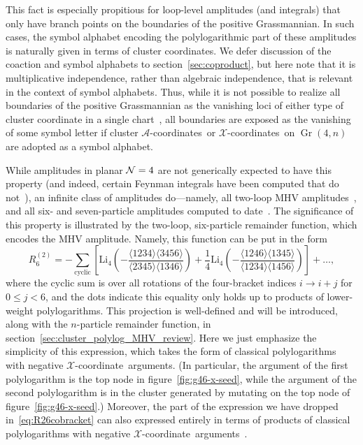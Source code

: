 \documentclass[11pt]{article}
\DeclareMathOperator{\Gr}{Gr}
\def\xcoord{$\mathcal{X}$-coordinate}
\def\xcoords{$\mathcal{X}$-coordinates}
\def\acoords{$\mathcal{A}$-coordinates}
\begin{document}
This fact is especially propitious for loop-level amplitudes (and integrals) that only have branch points on the boundaries of the positive Grassmannian. In such cases, the symbol alphabet encoding the polylogarithmic part of these amplitudes is naturally given in terms of cluster coordinates. We defer discussion of the coaction and symbol alphabets to section~\ref{sec:coproduct}, but here note that it is multiplicative independence, rather than algebraic independence, that is relevant in the context of symbol alphabets. Thus, while it is not possible to realize all boundaries of the positive Grassmannian as the vanishing loci of either type of cluster coordinate in a single chart~\cite{ArkaniHamed:2012nw}, all boundaries are exposed as the vanishing of some symbol letter if cluster \acoords\ or \xcoords\ on $\Gr(4,n)$ are adopted as a symbol alphabet.

While amplitudes in planar ${\cal N}=4$ are not generically expected to have this property (and indeed, certain Feynman integrals have been computed that do not~\cite{Bourjaily:2018aeq,Henn:2018cdp}), an infinite class of amplitudes do---namely, all two-loop MHV amplitudes~\cite{CaronHuot:2011ky}, and all six- and seven-particle amplitudes computed to date~\cite{CaronHuot:2011kk,Dixon:2014iba,Drummond:2014ffa,Dixon:2015iva,Caron-Huot:2016owq,Dixon:2016nkn}. The significance of this property is illustrated by the two-loop, six-particle remainder function, which encodes the MHV amplitude. Namely, this function can be put in the form
\begin{equation} \label{eq:R26cobracket}
	R^{(2)}_6 = -\sum_{\text{cyclic}} \left[ \text{Li}_4\left(-\frac{\langle 1234 \rangle \langle 3456 \rangle}{\langle 2345 \rangle \langle 1346 \rangle}\right) + \frac{1}{4} \text{Li}_4 \left(-\frac{\langle 1246 \rangle \langle 1345 \rangle}{\langle 1234 \rangle \langle 1456 \rangle}\right) \right] + \dots,
\end{equation}
where the cyclic sum is over all rotations of the four-bracket indices $i \rightarrow i+j$ for $0\leq j <6$, and the dots indicate this equality only holds up to products of lower-weight polylogarithms. This projection is well-defined and will be introduced, along with the $n$-particle remainder function, in section~\ref{sec:cluster_polylog_MHV_review}. Here we just emphasize the simplicity of this expression, which takes the form of classical polylogarithms with negative \xcoord\ arguments. (In particular, the argument of the first polylogarithm is the top node in figure~\ref{fig:g46-x-seed}, while the argument of the second polylogarithm is in the cluster generated by mutating on the top node of figure~\ref{fig:g46-x-seed}.) Moreover, the part of the expression we have dropped in~\eqref{eq:R26cobracket} can also expressed entirely in terms of products of classical polylogarithms with negative \xcoord\ arguments~\cite{Golden:2014xqf}. 
\end{document}
